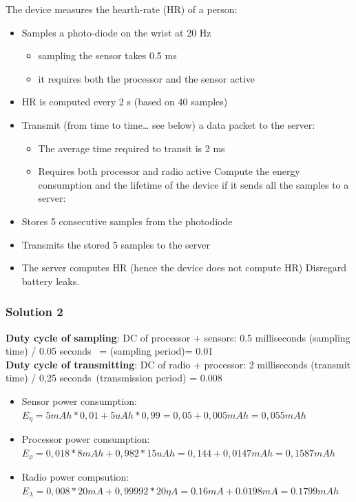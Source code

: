 The device measures the hearth-rate (HR) of a person:
\begin{itemize}
	\item 
	Samples a photo-diode on the wrist at 20 Hz
	\begin{itemize}
		\item 
		sampling the sensor takes 0.5 ms
		\item 
		it requires both the processor and the sensor active
	\end{itemize}
	\item 
	HR is computed every 2 s (based on 40 samples)
	\item 
	Transmit (from time to time… see below) a data packet to the server:
	\begin{itemize}
		\item 
		The average time required to transit is 2 ms
		\item 
		Requires both processor and radio active
		Compute the energy consumption and the lifetime of the device if it sends all the samples to a server:
	\end{itemize}
	\item 
	Stores 5 consecutive samples from the photodiode
	\item 
	Transmits the stored 5 samples to the server
	\item 
	The server computes HR (hence the device does not compute HR)
	Disregard battery leaks.
\end{itemize}
\subsubsection{Solution 2}\label{sec:solution-2}
\textbf{Duty cycle of sampling}: DC of processor + sensors: 0.5 milliseconds (sampling time) / 0.05 seconds  = (sampling period)= 0.01\\

\textbf{Duty cycle of transmitting}: DC of radio + processor: 2 milliseconds (transmit time) / 0,25 seconds (transmission period) = 0.008
\begin{itemize}
	\item Sensor power consumption:
	$E_{\eta} = 5 mAh * 0,01+ 5 uAh *0,99 =0,05+0,005 mAh = 0,055 mAh$
	\item Processor power consumption:
	$E_{\rho}=0,018*8 mAh + 0,982*15 uAh =0,144+0,0147 mAh = 0,1587 mAh$
	\item Radio power compsution:
	$E_{\lambda}=0,008*20 mA + 0,99992*20\eta A = 0.16 mA + 0.0198 mA = 0.1799 mAh$
\end{itemize}

